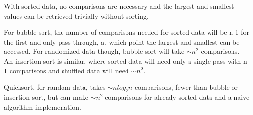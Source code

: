 \documentclass[a4paper,11pt]{article}
\begin{document}
With sorted data, no comparisons are necessary and the largest and smallest values can be retrieved trivially without sorting.

For bubble sort, the number of comparisons needed for sorted data will be n-1 for the first and only pass through, at which point the 
largest and smallest can be accessed.  For randomized data though, bubble sort will take $\sim n^2$ comparisons.  An insertion sort is similar, where sorted data will need only a single pass with n-1 comparisons and shuffled data will need $\sim n^2$.

Quicksort, for random data, takes $\sim n log_2 n$ comparisons, fewer than bubble or insertion sort, but can make $\sim n^2$ comparisons
for already sorted data and a naive algorithm implemenation.

\end{document}
